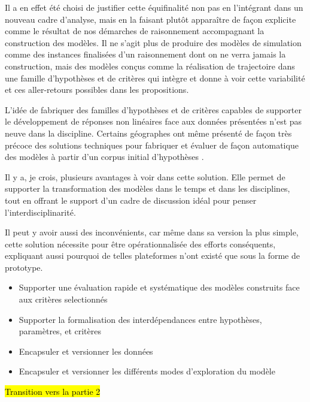 Il a en effet été choisi de justifier cette équifinalité non pas en l'intégrant dans un nouveau cadre d'analyse, mais en la faisant plutôt apparaître de façon explicite comme le résultat de nos démarches de raisonnement accompagnant la construction des modèles. Il ne s'agit plus de produire des modèles de simulation comme des instances finalisées d'un raisonnement dont on ne verra jamais la construction, mais des modèles conçus comme la réalisation de trajectoire dans une famille d'hypothèses et de critères qui intègre et donne à voir cette variabilité et ces aller-retours possibles dans les propositions.

L'idée de fabriquer des familles d'hypothèses et de critères capables de supporter le développement de réponses non linéaires face aux données présentées n'est pas neuve dans la discipline. Certains géographes ont même présenté de façon très précoce des solutions techniques pour fabriquer et évaluer de façon automatique des modèles à partir d'un corpus initial d'hypothèses \autocite{Openshaw1988}.

Il y a, je crois, plusieurs avantages à voir dans cette solution.  Elle permet de supporter la transformation des modèles dans le temps et dans les disciplines, tout en offrant le support d'un cadre de discussion idéal pour penser l'interdisciplinarité.

Il peut y avoir aussi des inconvénients, car même dans sa version la plus simple, cette solution nécessite pour être opérationnalisée des efforts conséquents, expliquant aussi pourquoi de telles plateformes n'ont existé que sous la forme de prototype.

\begin{itemize}
\item Supporter une évaluation rapide et systématique des modèles construits face aux critères selectionnés
\item Supporter la formalisation des interdépendances entre hypothèses, paramètres, et critères
\item Encapsuler et versionner les données
\item Encapsuler et versionner les différents modes d'exploration du modèle
\end{itemize}

\hl{Transition vers la partie 2}


